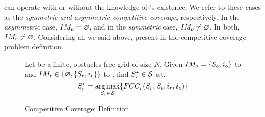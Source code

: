 \opp can operate with or without the knowledge of \rob's existence. We refer to these cases as the {\em symmetric and asymmetric competitive coverage}, respectively.
In the {\em asymmetric} case, $IM_o=\varnothing$, and in the {\em symmetric} case, $IM_o \neq \varnothing$. In both, $IM_r \neq \varnothing $.
Considering all we said above, present in  the competitive coverage problem definition.
\begin{figure}
    \centering
    \begin{mdframed}[backgroundcolor=gray!20] 
\begin{definition}
Let \w be a finite, obstacles-free grid of size $N$. Given $IM_o=\lbrace S_o ,i_o \rbrace$ to \rob and $IM_r \in \lbrace \varnothing, \lbrace S_r, i_r \rbrace \rbrace$ to \opp, find $S_r^\star \in \mathcal{S}$ s.t.
\begin{dmath*}[compact]
S_\rob^\star =\argmax_{S_\rob\in\mathcal{S}} \lbrace \fcc_{r}(S_\rob, S_\opp, i_\rob, i_\opp ) \rbrace
\end{dmath*}
\end{definition}
\end{mdframed}
    \caption{Competitive Coverage: Definition}
    \label{definitions: problem}
\end{figure}
